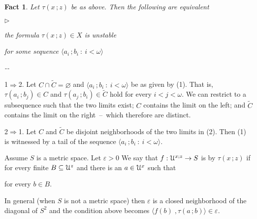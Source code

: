 \documentclass{amsproc}
\makeatletter
\newcommand{\mylabel}[1]{{#1}\hfill}
\renewenvironment{itemize}
  {\begin{list}{$\triangleright$}{%
  \setlength{\parskip}{0mm}
  \setlength{\topsep}{.1\baselineskip}
  \setlength{\rightmargin}{0mm}
  \setlength{\listparindent}{0mm}
  \setlength{\itemindent}{0mm}
  \setlength{\labelwidth}{3ex}
  \setlength{\itemsep}{.1\baselineskip}
  \setlength{\parsep}{.1\baselineskip}
  \setlength{\partopsep}{0mm}
  \setlength{\labelsep}{1ex}
  \setlength{\leftmargin}{\labelwidth+\labelsep}
  \let\makelabel\mylabel}}{%
\end{list}}
\newcounter{thm}
\theoremstyle{mio}
\newtheorem{fact}[thm]{Fact}\tcolorboxenvironment{fact}{mythm}
\providecommand{\proofNameStyle}{\bfseries}
\renewenvironment{proof}[1][\proofname]{\par
  \pushQED{\qed}%
  \normalfont%
  \trivlist
  \item[\hskip\labelsep
        \proofNameStyle
    #1\@addpunct{.}]\ignorespaces
}{%
  \popQED\endtrivlist\@endpefalse
}
\renewcommand*{\emph}[1]{%
   \smash{\tikz[baseline]\node[rectangle, fill=teal!25, rounded corners, inner xsep=0.5ex, inner ysep=0.2ex, anchor=base, minimum height = 2.7ex]{\strut #1};}}
\makeatother
\begin{document}
\begin{fact}
  Let $\tau(x\,;z)$ be as above.
  Then the following are equivalent
  \begin{itemize}
    \item [1.] the formula $\tau(x\,;z)\in X$ is unstable
    \item [2.] for some sequence $\langle a_i\,;b_i\ :\ i<\omega\rangle$\smallskip
    
    \noindent\kern-\kern-



  \end{itemize}
\end{fact}

\begin{proof}
  1$\Rightarrow$2.
  Let $C\cap\tilde C=\varnothing$ and $\langle a_i\,;b_i\ :\ i<\omega\rangle$ be as given by (1).
  That is, $\tau(a_i\,;b_j)\in C$ and $\tau(a_j\,;b_i)\in \tilde C$ hold for every $i<j<\omega$.
  We can restrict to a subsequence such that the two limits exist; $C$ contains the limit on the left; and $\tilde C$ contains the limit on the right~--~which therefore are distinct.%

  2$\Rightarrow$1. Let $C$ and $\tilde C$ be disjoint neighborhoods of the two limits in (2).
  Then (1) is witnessed by a tail of the sequence $\langle a_i\,;b_i\ :\ i<\omega\rangle$.
\end{proof}

Assume $S$ is a metric space.
Let $\varepsilon>0$
We say that $f:{\EuScript U}^{x;z}\to S$ is \emph{$\varepsilon$-approximable\/} by $\tau(x\,;z)$ if for every finite $B\subseteq{\EuScript U}^z$ and there is an $a\in{\EuScript U}^x$ such that

\hfill for every $b\in B$.

In general (when $S$ is not a metric space) then $\varepsilon$ is a closed neighborhood of the diagonal of $S^2$ and the condition above becomes $\big\langle f(b)\;,\tau(a\,;b)\big\rangle\in\varepsilon$.
\end{document}
